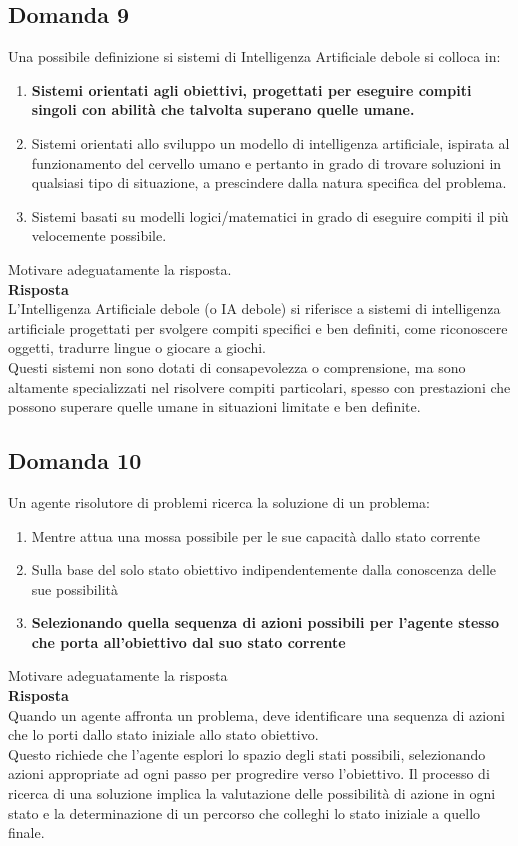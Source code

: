 \documentclass[../main.tex]{subfiles}
\begin{document}
	\subsection{Domanda 9}
	Una possibile definizione si sistemi di Intelligenza Artificiale debole si colloca in:
	\begin{enumerate}
		\item \textbf{Sistemi orientati agli obiettivi, progettati per eseguire compiti singoli con abilità che talvolta superano quelle umane.}
		\item Sistemi orientati allo sviluppo un modello di intelligenza artificiale, ispirata al funzionamento del cervello umano e pertanto in grado di trovare soluzioni in qualsiasi tipo di situazione, a prescindere dalla natura specifica del problema.
		\item Sistemi basati su modelli logici/matematici in grado di eseguire compiti il più velocemente possibile. 
	\end{enumerate}
	Motivare adeguatamente la risposta.\\
	\textbf{Risposta}\\
	L'Intelligenza Artificiale debole (o IA debole) si riferisce a sistemi di intelligenza artificiale progettati per svolgere compiti specifici e ben definiti, come riconoscere oggetti, tradurre lingue o giocare a giochi.\\
	Questi sistemi non sono dotati di consapevolezza o comprensione, ma sono altamente specializzati nel risolvere compiti particolari, spesso con prestazioni che possono superare quelle umane in situazioni limitate e ben definite.
	\subsection{Domanda 10}
	Un agente risolutore di problemi ricerca la soluzione di un problema: 
	\begin{enumerate}
		\item Mentre attua una mossa possibile per le sue capacità dallo stato corrente 
		\item Sulla base del solo stato obiettivo indipendentemente dalla conoscenza delle sue possibilità 
		\item \textbf{Selezionando quella sequenza di azioni possibili per l’agente stesso che porta all’obiettivo dal suo stato corrente}
	\end{enumerate}
	Motivare adeguatamente la risposta\\
	\textbf{Risposta}\\
	Quando un agente affronta un problema, deve identificare una sequenza di azioni che lo porti dallo stato iniziale allo stato obiettivo.\\
	Questo richiede che l'agente esplori lo spazio degli stati possibili, selezionando azioni appropriate ad ogni passo per progredire verso l'obiettivo. Il processo di ricerca di una soluzione implica la valutazione delle possibilità di azione in ogni stato e la determinazione di un percorso che colleghi lo stato iniziale a quello finale.
\end{document}

